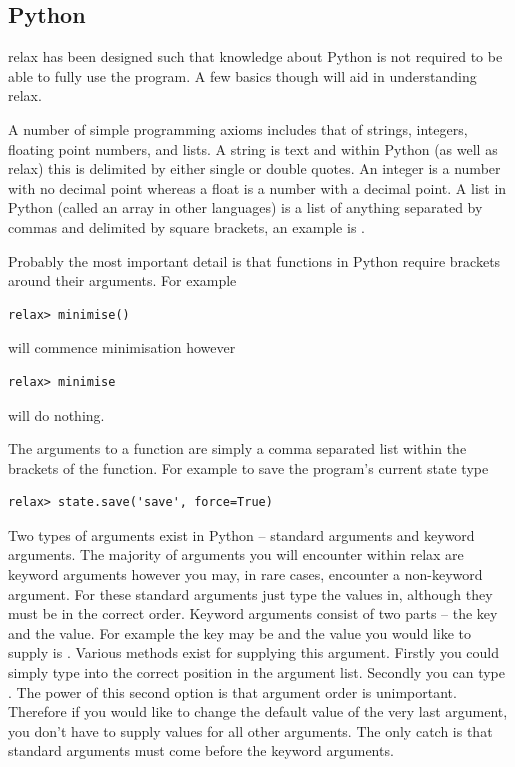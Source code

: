 
\subsection{Python}

relax has been designed such that knowledge about Python is not required to be able to fully use the program.
A few basics though will aid in understanding relax.

A number of simple programming axioms includes that of strings, integers, floating point numbers, and lists.
A string is text and within Python (as well as relax) this is delimited by either single or double quotes.
An integer is a number with no decimal point whereas a float is a number with a decimal point.
A list in Python (called an array in other languages) is a list of anything separated by commas and delimited by square brackets, an example is \prompt{[0, 1, 2, `a', 1.2143235]}.

Probably the most important detail is that functions in Python require brackets around their arguments.
For example

\begin{lstlisting}[numbers=none]
relax> minimise()
\end{lstlisting}

will commence minimisation however

\begin{lstlisting}[numbers=none]
relax> minimise
\end{lstlisting}

will do nothing.

The arguments to a function are simply a comma separated list within the brackets of the function.
For example to save the program's current state type

\begin{lstlisting}[numbers=none]
relax> state.save('save', force=True)
\end{lstlisting}

Two types of arguments exist in Python -- standard arguments and keyword arguments.
The majority of arguments you will encounter within relax are keyword arguments however you may, in rare cases, encounter a non-keyword argument.
For these standard arguments just type the values in, although they must be in the correct order.
Keyword arguments consist of two parts -- the key and the value.
For example the key may be  and the value you would like to supply is .
Various methods exist for supplying this argument.
Firstly you could simply type  into the correct position in the argument list.
Secondly you can type .
The power of this second option is that argument order is unimportant.
Therefore if you would like to change the default value of the very last argument, you don't have to supply values for all other arguments.
The only catch is that standard arguments must come before the keyword arguments.


